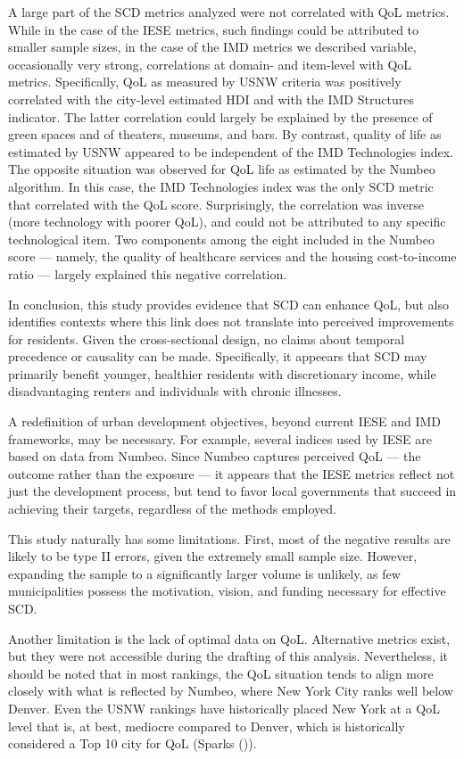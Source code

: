 \documentclass[
  english,
  12pt,
  a4paper,
]{scrartcl}
\begin{document}
A large part of the SCD metrics analyzed were not correlated with QoL
metrics. While in the case of the IESE metrics, such findings could be
attributed to smaller sample sizes, in the case of the IMD metrics we
described variable, occasionally very strong, correlations at domain-
and item-level with QoL metrics. Specifically, QoL as measured by USNW
criteria was positively correlated with the city-level estimated HDI and
with the IMD Structures indicator. The latter correlation could largely
be explained by the presence of green spaces and of theaters, museums,
and bars. By contrast, quality of life as estimated by USNW appeared to
be independent of the IMD Technologies index. The opposite situation was
observed for QoL life as estimated by the Numbeo algorithm. In this
case, the IMD Technologies index was the only SCD metric that correlated
with the QoL score. Surprisingly, the correlation was inverse (more
technology with poorer QoL), and could not be attributed to any specific
technological item. Two components among the eight included in the
Numbeo score --- namely, the quality of healthcare services and the
housing cost-to-income ratio --- largely explained this negative
correlation.

In conclusion, this study provides evidence that SCD can enhance QoL,
but also identifies contexts where this link does not translate into
perceived improvements for residents. Given the cross-sectional design,
no claims about temporal precedence or causality can be made.
Specifically, it appeears that SCD may primarily benefit younger,
healthier residents with discretionary income, while disadvantaging
renters and individuals with chronic illnesses.

A redefinition of urban development objectives, beyond current IESE and
IMD frameworks, may be necessary. For example, several indices used by
IESE are based on data from Numbeo. Since Numbeo captures perceived QoL
--- the outcome rather than the exposure --- it appears that the IESE
metrics reflect not just the development process, but tend to favor
local governments that succeed in achieving their targets, regardless of
the methods employed.

This study naturally has some limitations. First, most of the negative
results are likely to be type II errors, given the extremely small
sample size. However, expanding the sample to a significantly larger
volume is unlikely, as few municipalities possess the motivation,
vision, and funding necessary for effective SCD.

Another limitation is the lack of optimal data on QoL. Alternative
metrics exist, but they were not accessible during the drafting of this
analysis. Nevertheless, it should be noted that in most rankings, the
QoL situation tends to align more closely with what is reflected by
Numbeo, where New York City ranks well below Denver. Even the USNW
rankings have historically placed New York at a QoL level that is, at
best, mediocre compared to Denver, which is historically considered a
Top 10 city for QoL (Sparks
()).
\end{document}
